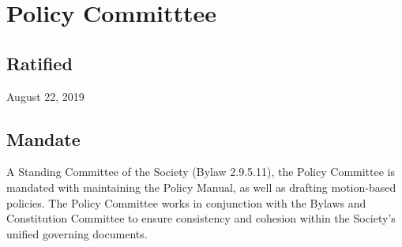\section{Policy Committtee}
\subsection{Ratified}
August 22, 2019
\subsection{Mandate}
A Standing Committee of the Society (Bylaw 2.9.5.11), the Policy Committee is mandated with maintaining the Policy Manual, as well as drafting motion-based policies. The Policy Committee works in conjunction with the Bylaws and Constitution Committee to ensure consistency and cohesion within the Society’s unified governing documents.
